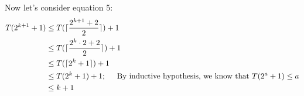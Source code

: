 \documentclass[10pt]{exam}
\begin{document}
\begin{parts}
\begin{customsolutionbox}
        Now let's consider equation 5:
        \begin{align}
            T(2^{k+1} + 1) &\leq T(\lceil\frac{2^{k+1}+2}{2}\rceil) + 1 \\
            &\leq  T(\lceil\frac{2^{k}\cdot 2+2}{2}\rceil) + 1 \\
            &\leq  T(\lceil 2^k + 1 \rceil) + 1 \\
            &\leq T(2^k + 1) + 1;   \hspace{5mm} \text{By inductive hypothesis, we know that } T(2^{a} + 1) \leq a  \\
            &\leq k + 1
        \end{align}
    \end{customsolutionbox}
\end{parts}
\end{document}
